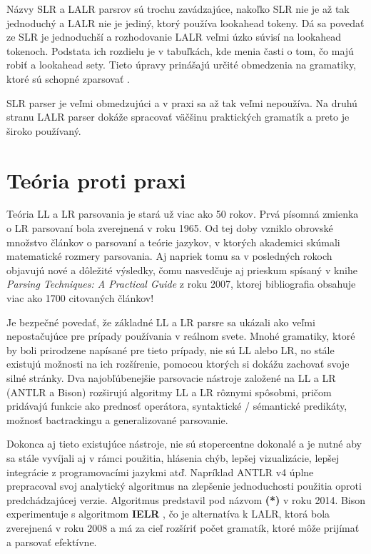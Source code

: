 Názvy SLR a LALR parsrov sú trochu zavádzajúce, nakoľko SLR nie je až tak jednoduchý a LALR nie je jediný, ktorý používa lookahead tokeny. Dá sa povedať ze SLR je jednoduchší a rozhodovanie LALR veľmi úzko súvisí na lookahead tokenoch. Podstata ich rozdielu je v tabuľkách, kde menia časti o tom, čo majú robiť a lookahead sety. Tieto úpravy prinášajú určité obmedzenia na gramatiky, ktoré sú schopné zparsovať \cite{tomassetti:parsing}.

SLR parser je veľmi obmedzujúci a v praxi sa až tak veľmi nepoužíva. Na druhú stranu LALR parser dokáže spracovať väčšinu praktických gramatík a preto je široko používaný.

\section{Teória proti praxi}
Teória LL a LR parsovania je stará už viac ako 50 rokov. Prvá písomná zmienka o LR parsovaní \cite{LR} bola zverejnená v roku 1965. Od tej doby vzniklo obrovské množstvo  článkov o parsovaní a teórie jazykov, v ktorých akademici skúmali matematické rozmery parsovania. Aj napriek tomu sa v posledných rokoch objavujú nové a dôležité výsledky, čomu nasvedčuje aj prieskum spísaný v knihe \textit{Parsing Techniques: A Practical Guide} \cite{grune2007parsing} z roku 2007, ktorej bibliografia obsahuje viac ako 1700 citovaných článkov! \cite{haberman:hard_parsing}

Je bezpečné povedať, že základné LL a LR parsre sa ukázali ako veľmi nepostačujúce pre prípady používania v reálnom svete. Mnohé gramatiky, ktoré by boli prirodzene napísané pre tieto prípady, nie sú LL alebo LR, no stále existujú možnosti na ich rozšírenie, pomocou ktorých si dokážu zachovať svoje silné stránky. Dva najobľúbenejšie parsovacie nástroje založené na LL a LR (ANTLR a Bison) rozširujú algoritmy LL a LR rôznymi spôsobmi, pričom pridávajú funkcie ako prednosť operátora, syntaktické / sémantické predikáty, možnosť bactrackingu a generalizované parsovanie.

Dokonca aj tieto existujúce nástroje, nie sú stopercentne dokonalé a je nutné aby sa stále vyvíjali aj v rámci použitia, hlásenia chýb, lepšej vizualizácie, lepšej integrácie z programovacími jazykmi atď. Napríklad ANTLR v4 úplne prepracoval svoj analytický algoritmus na zlepšenie jednoduchosti použitia oproti predchádzajúcej verzie. Algoritmus predstavil pod názvom \textbf{(*)}\cite{ALL} v roku 2014. Bison experimentuje s algoritmom \textbf{IELR} \cite{IELR}, čo je alternatíva k LALR, ktorá bola zverejnená v roku 2008 a má za cieľ rozšíriť počet gramatík, ktoré môže prijímať a parsovať efektívne.

